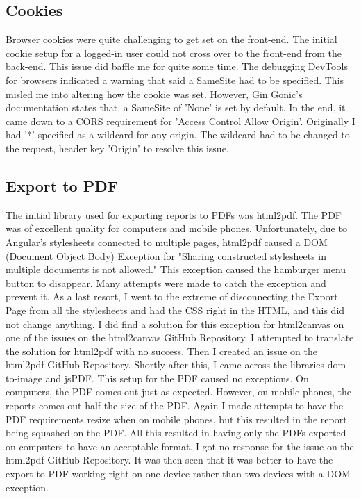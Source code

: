 \subsection{Cookies}
Browser cookies were quite challenging to get set on the front-end. The initial cookie setup for a logged-in user could not cross over to the front-end from the back-end. This issue did baffle me for quite some time. The debugging DevTools for browsers indicated a warning that said a SameSite had to be specified. This misled me into altering how the cookie was set. However, Gin Gonic's documentation states that, a SameSite of 'None' is set by default. In the end, it came down to a CORS requirement for  'Access Control Allow Origin'. Originally I had '*' specified as a wildcard for any origin. The wildcard had to be changed to the request, header key 'Origin' to resolve this issue.

\subsection{Export to PDF}
The initial library used for exporting reports to PDFs was html2pdf. The PDF was of excellent quality for computers and mobile phones. Unfortunately, due to Angular's stylesheets connected to multiple pages, html2pdf caused a DOM (Document Object Body) Exception for "Sharing constructed stylesheets in multiple documents is not allowed." This exception caused the hamburger menu button to disappear. Many attempts were made to catch the exception and prevent it. As a last resort, I went to the extreme of disconnecting the Export Page from all the stylesheets and had the CSS right in the HTML, and this did not change anything. I did find a solution for this exception for html2canvas on one of the issues on the html2canvas GitHub Repository. I attempted to translate the solution for html2pdf with no success. Then I created an issue on the html2pdf GitHub Repository. Shortly after this, I came across the libraries dom-to-image and jsPDF. This setup for the PDF caused no exceptions. On computers, the PDF comes out just as expected. However, on mobile phones, the reports comes out half the size of the PDF. Again I made attempts to have the PDF requirements resize when on mobile phones, but this resulted in the report being squashed on the PDF. All this resulted in having only the PDFs exported on computers to have an acceptable format. I got no response for the issue on the html2pdf GitHub Repository. It was then seen that it was better to have the export to PDF working right on one device rather than two devices with a DOM exception.


